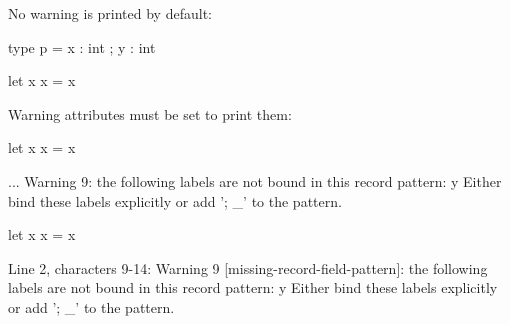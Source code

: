 No warning is printed by default:

\begin{ocaml}
type p = { x : int ; y : int }

let x { x } = x
\end{ocaml}

Warning attributes must be set to print them:

\begin{ocaml}
[@@@warning "+9"]
let x { x } = x
\end{ocaml}
\begin{mdx-error}
...
Warning 9: the following labels are not bound in this record pattern:
y
Either bind these labels explicitly or add '; _' to the pattern.
\end{mdx-error}

\begin{ocaml}
[@@@warning "+9"]
let x { x } = x
\end{ocaml}
\begin{mdx-error}
Line 2, characters 9-14:
Warning 9 [missing-record-field-pattern]: the following labels are not bound in this record pattern:
y
Either bind these labels explicitly or add '; _' to the pattern.
\end{mdx-error}
